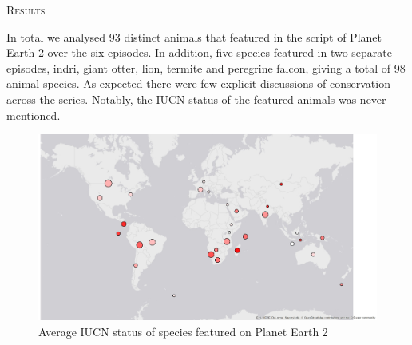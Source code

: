 \documentclass[12pt,letterpaper]{article}
\renewcommand{\section}[1]{%
\bigskip
\begin{center}
\begin{Large}
\normalfont\scshape #1
\medskip
\end{Large}
\end{center}}
\begin{document}
\section{Results}
In total we analysed 93 distinct animals that featured in the script of Planet Earth 2 over the six episodes. In addition, five species featured in two separate episodes, indri, giant otter, lion, termite and peregrine falcon, giving a total of 98 animal species. As expected there were few explicit discussions of conservation across the series. Notably, the IUCN status of the featured animals was never mentioned.  
\begin{figure}[H]
\centering
    \includegraphics[keepaspectratio, totalheight=0.5 \textheight]{map2.jpg}
\caption{Average IUCN status of species featured on Planet Earth 2}
\label{info.diff}
\end{figure}
\end{document}
